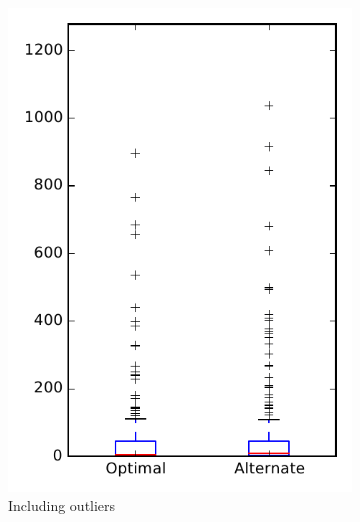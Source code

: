 
\begin{figure}
    \centering
    \begin{subfigure}{.4\textwidth}
        \centering
        \includegraphics[height=0.4\textheight]{figures/combo/flt_rq1_pig}
        \caption{Including outliers}\label{fig:combo:flt:rq1:pig_outlier}
    \end{subfigure}%
    \begin{subfigure}{.4\textwidth}
        \centering

\end{subfigure}
\end{figure}
